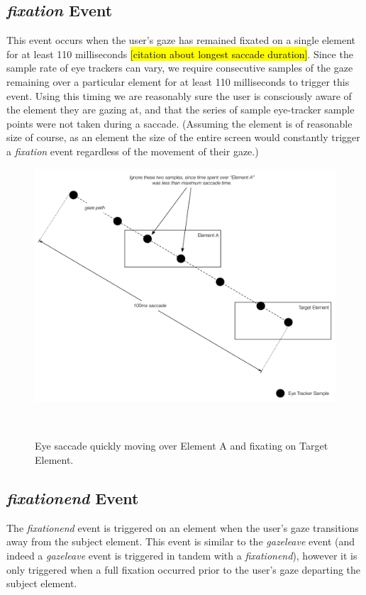 \documentclass{sigchi}
\begin{document}
\subsection{\textbf{\textit{fixation}} Event}
This event occurs when the user's gaze has remained fixated on a
single element for at least 110 milliseconds \hl{[citation about 
longest saccade duration]}. Since the sample rate of eye trackers 
can vary, we require consecutive samples of the gaze remaining over a 
particular element for at least 110 milliseconds to trigger this event. 
Using this timing we are reasonably sure the user is consciously aware 
of the element they are gazing at, and that the series of sample
eye-tracker sample points were not taken during a saccade. (Assuming 
the element is of reasonable size of course, as an element the size 
of the entire screen would constantly trigger a \textit{fixation} 
event regardless of the movement of their gaze.)

\begin{figure}
\centering
  \includegraphics[width=0.9\columnwidth]{figures/saccade.pdf}
  \caption{Eye saccade quickly moving over Element A and fixating on Target Element.}~\label{fig:saccade}
\end{figure}

\subsection{\textbf{\textit{fixationend}} Event}
The \textit{fixationend} event is triggered on an element when the 
user's gaze transitions away from the subject element. This event is
similar to the \textit{gazeleave} event (and indeed a \textit{gazeleave}
event is triggered in tandem with a \textit{fixationend}), however
it is only triggered when a full fixation occurred prior to the user's
gaze departing the subject element.
\end{document}
